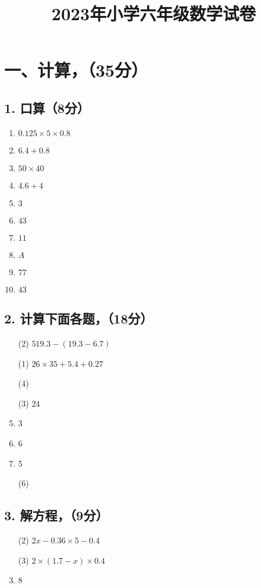 \documentclass[12pt]{article}
\begin{document}
\title{2023年小学六年级数学试卷}
\author{}
\date{}
\maketitle

\section*{一、计算，（35分）}

\subsection*{1. 口算（8分）}
\begin{enumerate}
    \item $0.125 \times 5 \times 0.8$
    \item $6.4 + 0.8$
    \item $50 \times 40$
    \item $4.6 + 4$
    \item $3$
    \item $43$
    \item $11$
    \item $A$
    \item $77$
    \item $43$
\end{enumerate}

\subsection*{2. 计算下面各题，（18分）}
\begin{enumerate}
    \item[(2)] $519.3 - (19.3 - 6.7)$
    \item[(1)] $26 \times 35 + 5.4 + 0.27$
    \item[(4)]
    \item[(3)] $24$
    \item 3
    \item 6
    \item 5
    \item[(6)]
\end{enumerate}

\subsection*{3. 解方程，（9分）}
\begin{enumerate}
    \item[(2)] $2x - 0.36 \times 5 - 0.4$
    \item[(3)] $2 \times (1.7 - x) \times 0.4$
    \item 8
\end{enumerate}
\end{document}

